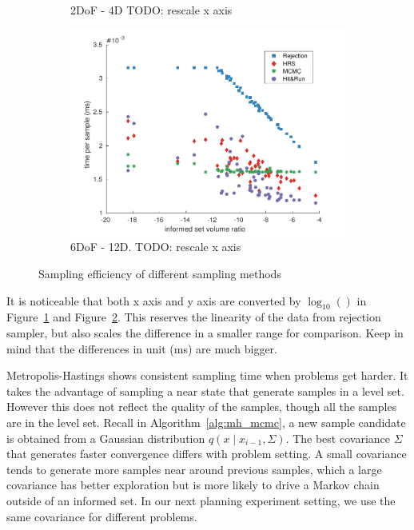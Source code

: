 \documentclass[letterpaper, 10 pt, conference]{ieeeconf}  %
\begin{document}
\begin{figure}[t!]
\begin{subfigure}[b]{0.78\linewidth}
		\caption{2DoF - 4D TODO: rescale x axis}
		\label{fig:sampling_efficiency:2d}
	\end{subfigure}
	\begin{subfigure}[b]{0.78\linewidth}
		\includegraphics[width=\linewidth]{fig/sampling_efficiency/sample_efficiency_6d}
		\caption{6DoF - 12D. TODO: rescale x axis}
		\label{fig:sampling_efficiency:6d}
	\end{subfigure}
	\caption{\captionstyle Sampling efficiency of different sampling methods}
	\label{fig:sampling_efficiency}
\end{figure} 


It is noticeable that both x axis and y axis are converted by $ \log_{10} () $ in Figure~\ref{fig:sampling_efficiency:2d} and Figure~\ref{fig:sampling_efficiency:6d}.
This reserves the linearity of the data from rejection sampler, but also scales the difference in a smaller range for comparison.
Keep in mind that the differences in unit (ms) are much bigger.

Metropolis-Hastings shows consistent sampling time when problems get harder. 
It takes the advantage of sampling a near state that generate samples in a level set.
However this does not reflect the quality of the samples, though all the samples are in the level set.
Recall in Algorithm~\ref{alg:mh_mcmc}, a new sample candidate is obtained from a Gaussian distribution $ q( x \mid x_{i-1}, \Sigma ) $.
The best covariance $ \Sigma $ that generates faster convergence differs with problem setting.
A small covariance tends to generate more samples near around previous samples, which a large covariance has better exploration but is more likely to drive a Markov chain outside of an informed set.
In our next planning experiment setting, we use the same covariance for different problems.
\end{document}
